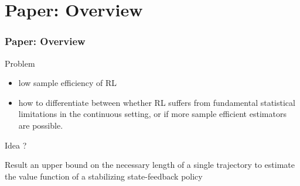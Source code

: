 \section{Paper: Overview}

\begin{frame}
\frametitle{Paper: Overview}

Problem
\begin{itemize}
\item low sample efficiency of RL
\item how to differentiate between whether
    RL suffers from fundamental statistical limitations in the continuous setting, or
    if more sample efficient estimators are possible.
\end{itemize}

Idea
?

Result
an upper bound on the necessary length of a single trajectory
to estimate the value function of a stabilizing state-feedback policy

\end{frame}

